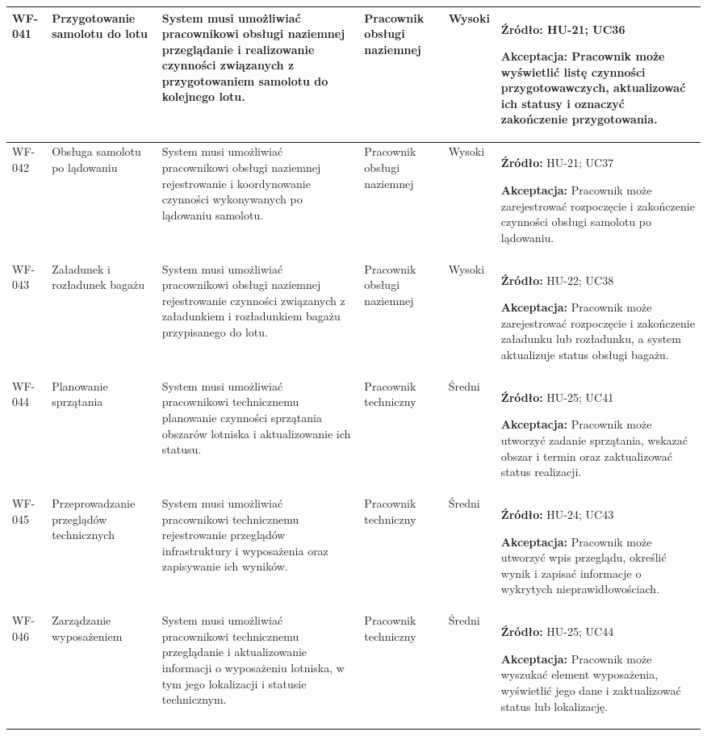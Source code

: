 \documentclass[12pt,a4paper,oneside]{report}
\begin{document}
\begin{longtable}{|p{1.05cm}|p{2.15cm}|p{3.35cm}|p{1.75cm}|p{0.95cm}|p{4.05cm}|}
WF-041 & Przygotowanie samolotu do lotu & System musi umożliwiać pracownikowi obsługi naziemnej przeglądanie i realizowanie czynności związanych z przygotowaniem samolotu do kolejnego lotu. & Pracownik obsługi naziemnej & Wysoki & \textbf{Źródło:} HU-21; UC36\par\textbf{Akceptacja:} Pracownik może wyświetlić listę czynności przygotowawczych, aktualizować ich statusy i oznaczyć zakończenie przygotowania.\\\hline
WF-042 & Obsługa samolotu po lądowaniu & System musi umożliwiać pracownikowi obsługi naziemnej rejestrowanie i koordynowanie czynności wykonywanych po lądowaniu samolotu. & Pracownik obsługi naziemnej & Wysoki & \textbf{Źródło:} HU-21; UC37\par\textbf{Akceptacja:} Pracownik może zarejestrować rozpoczęcie i zakończenie czynności obsługi samolotu po lądowaniu.\\\hline
WF-043 & Załadunek i rozładunek bagażu & System musi umożliwiać pracownikowi obsługi naziemnej rejestrowanie czynności związanych z załadunkiem i rozładunkiem bagażu przypisanego do lotu. & Pracownik obsługi naziemnej & Wysoki & \textbf{Źródło:} HU-22; UC38\par\textbf{Akceptacja:} Pracownik może zarejestrować rozpoczęcie i zakończenie załadunku lub rozładunku, a system aktualizuje status obsługi bagażu.\\\hline
WF-044 & Planowanie sprzątania & System musi umożliwiać pracownikowi technicznemu planowanie czynności sprzątania obszarów lotniska i aktualizowanie ich statusu. & Pracownik techniczny & Średni & \textbf{Źródło:} HU-25; UC41\par\textbf{Akceptacja:} Pracownik może utworzyć zadanie sprzątania, wskazać obszar i termin oraz zaktualizować status realizacji.\\\hline
WF-045 & Przeprowadzanie przeglądów technicznych & System musi umożliwiać pracownikowi technicznemu rejestrowanie przeglądów infrastruktury i wyposażenia oraz zapisywanie ich wyników. & Pracownik techniczny & Średni & \textbf{Źródło:} HU-24; UC43\par\textbf{Akceptacja:} Pracownik może utworzyć wpis przeglądu, określić wynik i zapisać informacje o wykrytych nieprawidłowościach.\\\hline
WF-046 & Zarządzanie wyposażeniem & System musi umożliwiać pracownikowi technicznemu przeglądanie i aktualizowanie informacji o wyposażeniu lotniska, w tym jego lokalizacji i statusie technicznym. & Pracownik techniczny & Średni & \textbf{Źródło:} HU-25; UC44\par\textbf{Akceptacja:} Pracownik może wyszukać element wyposażenia, wyświetlić jego dane i zaktualizować status lub lokalizację.\\\hline
\end{longtable}
\normalsize
\end{document}
